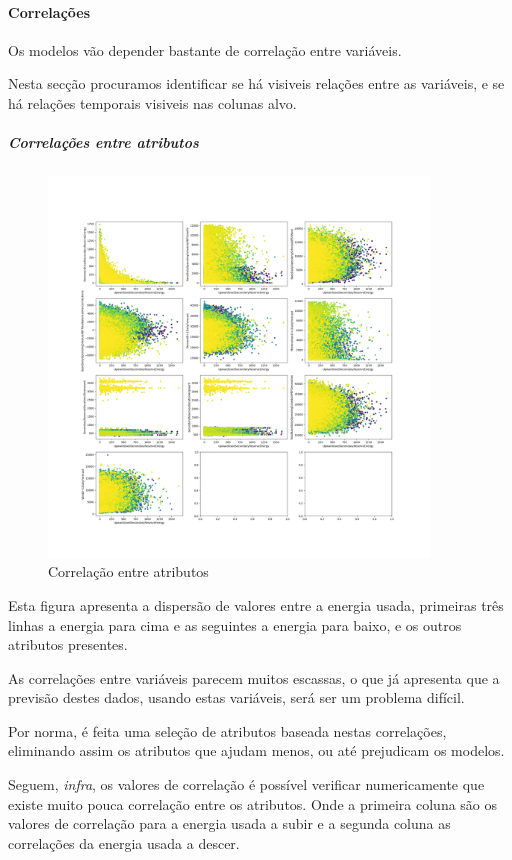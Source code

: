 \paragraph{Correlações}
\text{ }  \par

Os modelos vão depender bastante de correlação entre variáveis.

Nesta secção procuramos identificar se há visiveis relações entre as variáveis, e se há relações temporais  visiveis nas colunas alvo.


\subparagraph{Correlações entre atributos}
\text{ }  \par


\begin{figure}[H]
  \centering
  \includegraphics[width=0.90\textwidth]{plots/feature_correlation.png}
  \caption{Correlação entre atributos}
  \label{fig:featurecorrelation}
\end{figure}

Esta figura apresenta a dispersão de valores entre a energia usada, primeiras três linhas a energia para cima e as seguintes a energia para baixo, e os outros atributos presentes.\par
As correlações entre variáveis parecem muitos escassas, o que já apresenta que a previsão destes dados, usando estas variáveis, será ser um problema difícil.\par
Por norma, é feita uma seleção de atributos baseada nestas correlações, eliminando assim os atributos que ajudam menos, ou até prejudicam os modelos.\par
Seguem, \textit{infra}, os valores de correlação é possível verificar numericamente que existe muito pouca correlação entre os atributos. Onde a primeira coluna são os valores de correlação para a energia usada a subir e a segunda coluna as correlações da energia usada a descer.\par

